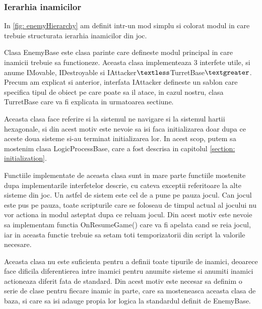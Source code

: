 \documentclass[12pt, a4paper]{article}
\begin{document}
	
	
	
	
	\subsubsection{Ierarhia inamicilor}
	

	In \ref{fig: enemyHierarchy} am definit intr-un mod simplu si colorat modul in care trebuie structurata ierarhia inamicilor din joc.
	\newline
	
	Clasa EnemyBase este clasa parinte care defineste modul principal in care inamicii trebuie sa functioneze. Aceasta clasa implementeaza 3 interfete utile, si anume IMovable, IDestroyable si IAttacker$\textless$TurretBase$\textgreater$. Precum am explicat si anterior, interfata IAttacker defineste un sablon care specifica tipul de obiect pe care poate sa il atace, in cazul nostru, clasa TurretBase care va fi explicata in urmatoarea sectiune.
	\newline
	
	Aceasta clasa face referire si la sistemul ne navigare si la sistemul hartii hexagonale, si din acest motiv este nevoie sa isi faca initializarea doar dupa ce aceste doua sisteme si-au terminat initializarea lor. In acest scop, putem sa mostenim clasa LogicProcessBase, care a fost descrisa in capitolul \ref{section: initialization}.
	\newline
	
	Functiile implementate de aceasta clasa sunt in mare parte functiile mostenite dupa implementarile interfetelor descrie, cu cateva exceptii referitoare la alte sisteme din joc. Un astfel de sistem este cel de a pune pe pauza jocul. Can jocul este pus pe pauza, toate scripturile care se foloseau de timpul actual al jocului nu vor actiona in modul asteptat dupa ce reluam jocul. Din acest motiv este nevoie sa implementam functia OnResumeGame() care va fi apelata cand se reia jocul, iar in aceasta functie trebuie sa setam toti temporizatorii din script la valorile necesare.
	\newline
	
	Aceasta clasa nu este suficienta pentru a definii toate tipurile de inamici, deoarece face dificila diferentierea intre inamici pentru anumite sisteme si anumiti inamici actioneaza diferit fata de standard. Din acest motiv este necesar sa definim o serie de clase pentru fiecare inamic in parte, care sa mosteneasca aceasta clasa de baza, si care sa isi adauge propia lor logica la standardul definit de EnemyBase.
	\newline
	
\end{document}
